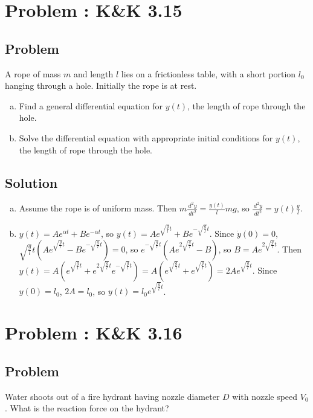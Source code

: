 \documentclass[solutions]{esg8012pset}
\renewcommand{\d}{\,d}
\begin{document}
\section{Problem \thesection: K\&K 3.15}
\subsection{Problem}
  A rope of mass $m$ and length $l$ lies on a frictionless table, with a short portion $l_0$ hanging through a hole. Initially the rope is at rest.
  \begin{enumerate}[(a)]
    \item Find a general differential equation for $y(t)$, the length of rope through the hole.
    \item Solve the differential equation with appropriate initial conditions for $y(t)$, the length of rope through the hole.
  \end{enumerate}
\subsection{Solution}
  \begin{enumerate}[(a)]
    \item Assume the rope is of uniform mass.  Then $m\frac{\d^2 y}{\d t^2} = \frac{y(t)}{l}m g$, so $\frac{\d^2 y}{\d t^2} = y(t)\frac{g}{l}$.
    \item $y(t) = Ae^{\alpha t} + Be^{-\alpha t}$, so $y(t) = Ae^{\sqrt{\frac{g}{l}}t}+Be^{-\sqrt{\frac{g}{l}}t}$.  Since $\dot y(0) = 0$, $\sqrt{\frac{g}{l}}t\left(Ae^{\sqrt{\frac{g}{l}}t}-Be^{-\sqrt{\frac{g}{l}}t}\right) = 0$, so $e^{-\sqrt{\frac{g}{l}}t}\left(Ae^{2\sqrt{\frac{g}{l}}t} - B\right)$, so $B = Ae^{2\sqrt{\frac{g}{l}}t}$.  Then $y(t) = A\left(e^{\sqrt{\frac{g}{l}}t}+e^{2\sqrt{\frac{g}{l}}t}e^{-\sqrt{\frac{g}{l}}t}\right) = A\left(e^{\sqrt{\frac{g}{l}}t}+e^{\sqrt{\frac{g}{l}}t}\right) = 2Ae^{\sqrt{\frac{g}{l}}t}$.  Since $y(0) = l_0$, $2A = l_0$, so $y(t) = l_0 e^{\sqrt{\frac{g}{l}}t}$.
  \end{enumerate}
\section{Problem \thesection: K\&K 3.16}
\subsection{Problem}
  Water shoots out of a fire hydrant having nozzle diameter $D$ with nozzle speed $V_0$. What is the reaction force on the hydrant?
\end{document}
